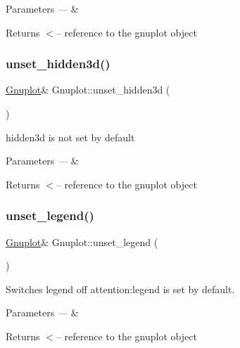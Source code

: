 \begin{DoxyParams}{Parameters}
{\em ---} & \\
\hline
\end{DoxyParams}
\begin{DoxyReturn}{Returns}
$<$-- reference to the gnuplot object 
\end{DoxyReturn}
\mbox{\label{class_gnuplot_ab8688182047f746090e1e5f2a8c11c9e}} 
\subsubsection{\texorpdfstring{unset\+\_\+hidden3d()}{unset\_hidden3d()}}
{\footnotesize\ttfamily \hyperlink{class_gnuplot}{Gnuplot}\& Gnuplot\+::unset\+\_\+hidden3d (\begin{DoxyParamCaption}{ }\end{DoxyParamCaption})\hspace{0.3cm}{\ttfamily [inline]}}

hidden3d is not set by default


\begin{DoxyParams}{Parameters}
{\em ---} & \\
\hline
\end{DoxyParams}
\begin{DoxyReturn}{Returns}
$<$-- reference to the gnuplot object 
\end{DoxyReturn}
\mbox{\label{class_gnuplot_ace901a18ab1a459213afd3ee0233b5ce}} 
\subsubsection{\texorpdfstring{unset\+\_\+legend()}{unset\_legend()}}
{\footnotesize\ttfamily \hyperlink{class_gnuplot}{Gnuplot}\& Gnuplot\+::unset\+\_\+legend (\begin{DoxyParamCaption}{ }\end{DoxyParamCaption})\hspace{0.3cm}{\ttfamily [inline]}}



Switches legend off attention\+:legend is set by default. 


\begin{DoxyParams}{Parameters}
{\em ---} & \\
\hline
\end{DoxyParams}
\begin{DoxyReturn}{Returns}
$<$-- reference to the gnuplot object 
\end{DoxyReturn}
\mbox{\label{class_gnuplot_aad76cdec16cfb5fdf82f45ed2786f4d8}} 
